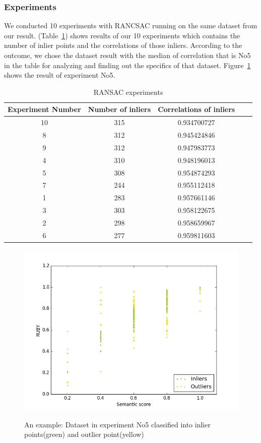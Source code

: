 \subsubsection{Experiments}
We conducted 10 experiments with RANCSAC running on the same dataset from our result.  (Table~\ref{table:RANSAC_experiments}) shows results of our 10 experiments which contains the number of inlier points and the correlations of those inliers. According to the outcome, we chose the dataset result with the median of correlation that is No5 in the table for analyzing and finding out the specifics of that dataset. Figure~\ref{fig:inliers_outliers} shows the result of experiment No5.
\begin{table}
	\caption{RANSAC experiments}
	\begin{tabular}{|c|c|c|c|c|}
		\hline
		Experiment Number & Number of inliers & Correlations of inliers \\
		\hline
		10	& 315	& 0.934700727 \\		
		8	& 312	& 0.945424846 \\	
		9	& 312	& 0.947983773 \\
		4	& 310	& 0.948196013 \\
		{\cellcolor[gray]{.8}}5	& {\cellcolor[gray]{.8}}308	& {\cellcolor[gray]{.8}}0.954874293 \\
		7	& 244	& 0.955112418 \\	
		1	& 283	& 0.957661146 \\
		3	& 303	& 0.958122675 \\
		2	& 298	& 0.958659967 \\
		6	& 277	& 0.959811603 \\		
		\hline
	\end{tabular}
	\label{table:RANSAC_experiments}
\end{table}

\begin{figure}[t]
	\caption{An example: Dataset in experiment No5 classified into inlier points(green) and outlier point(yellow)}
	\includegraphics[scale=0.4]{img/inliers_outliers.png}
	\centering
	\label{fig:inliers_outliers}
\end{figure}

